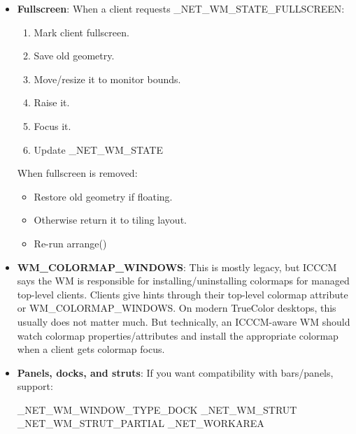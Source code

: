 \documentclass{report}
\begin{document}
\begin{itemize}
\begin{enumerate}
                \item \textbf{\_NET\_WM\_STATE\_FULLSCREEN:}	fullscreen behavior
            \end{enumerate}
            For a tiling WM, \_NET\_WM\_STATE\_FULLSCREEN is the most important modern state. A fullscreen window should usually cover the monitor work area or full monitor area, be above tiled windows, and suppress normal tiling while active.
        \item \textbf{Fullscreen}: When a client requests \_NET\_WM\_STATE\_FULLSCREEN:
            \begin{enumerate}
                \item Mark client fullscreen.
                \item Save old geometry.
                \item Move/resize it to monitor bounds.
                \item Raise it.
                \item Focus it.
                \item Update \_NET\_WM\_STATE
            \end{enumerate}
            When fullscreen is removed:
            \begin{itemize}
                \item Restore old geometry if floating.
                \item Otherwise return it to tiling layout.
                \item Re-run arrange()
            \end{itemize}
        \item \textbf{WM\_COLORMAP\_WINDOWS}:  
            This is mostly legacy, but ICCCM says the WM is responsible for installing/uninstalling colormaps for managed top-level clients. Clients give hints through their top-level colormap attribute or WM\_COLORMAP\_WINDOWS.
            \bigbreak \noindent 
            On modern TrueColor desktops, this usually does not matter much. But technically, an ICCCM-aware WM should watch colormap properties/attributes and install the appropriate colormap when a client gets colormap focus.
        \item \textbf{Panels, docks, and struts}: If you want compatibility with bars/panels, support:
            \bigbreak \noindent 
            \begin{cppcode}
                _NET_WM_WINDOW_TYPE_DOCK
                _NET_WM_STRUT
                _NET_WM_STRUT_PARTIAL
                _NET_WORKAREA

\end{cppcode}
\end{itemize}
\end{document}
